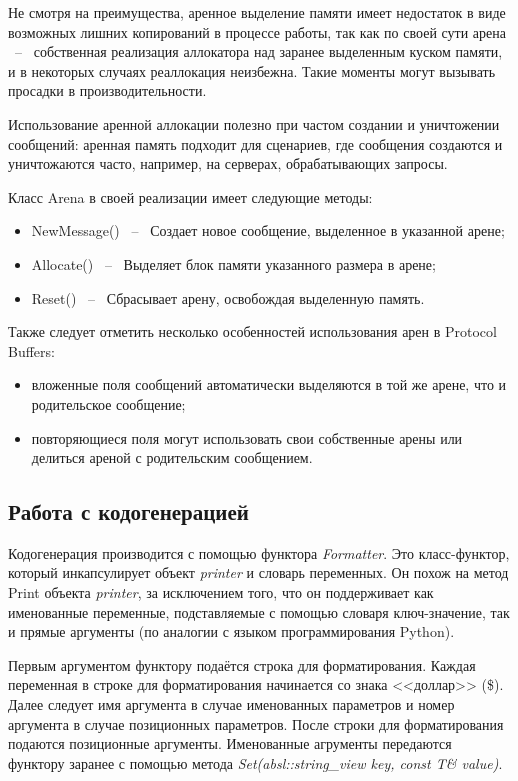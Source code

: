 Не смотря на преимущества, аренное выделение памяти имеет недостаток в виде возможных лишних копирований в процессе работы, так как по своей сути арена ~--~ собственная реализация аллокатора над заранее выделенным куском памяти, и в некоторых случаях реаллокация неизбежна. Такие моменты могут вызывать просадки в производительности.

Использование аренной аллокации полезно при частом создании и уничтожении сообщений: аренная память подходит для сценариев, где сообщения создаются и уничтожаются часто, например, на серверах, обрабатывающих запросы.

Класс Arena в своей реализации имеет следующие методы:
\begin{itemize}
    \item NewMessage() ~--~ Создает новое сообщение, выделенное в указанной арене;
    \item Allocate() ~--~ Выделяет блок памяти указанного размера в арене;
    \item Reset() ~--~ Сбрасывает арену, освобождая выделенную память.
\end{itemize}

Также следует отметить несколько особенностей использования арен в Protocol Buffers:

\begin{itemize}
    \item вложенные поля сообщений автоматически выделяются в той же арене, что и родительское сообщение;
    \item повторяющиеся поля могут использовать свои собственные арены или делиться ареной с родительским сообщением.
\end{itemize}

\subsection{Работа с кодогенерацией}

Кодогенерация производится с помощью функтора \textit{Formatter}.
Это класс-функтор, который инкапсулирует объект \textit{printer} и словарь переменных.
Он похож на метод Print объекта \textit{printer}, за исключением того, что он поддерживает как именованные переменные, подставляемые с помощью словаря ключ-значение, так и прямые аргументы (по аналогии с языком программирования Python).

Первым аргументом функтору подаётся строка для форматирования. Каждая переменная в строке для форматирования начинается со знака <<доллар>> (\$).
Далее следует имя аргумента в случае именованных параметров и номер аргумента в случае позиционных параметров. 
После строки для форматирования подаются позиционные аргументы.
Именованные агрументы передаются функтору заранее с помощью метода \textit{Set(absl::string\_view key, const T\& value)}.

